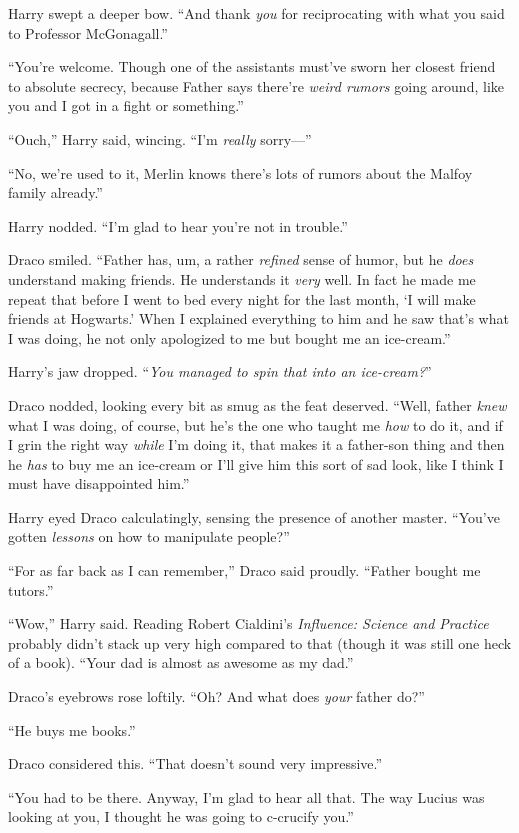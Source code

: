 Harry swept a deeper bow. “And thank \emph{you} for reciprocating with what you said to Professor McGonagall.”

“You’re welcome. Though one of the assistants must’ve sworn her closest friend to absolute secrecy, because Father says there’re \emph{weird rumors} going around, like you and I got in a fight or something.”

“Ouch,” Harry said, wincing. “I’m \emph{really} sorry—”

“No, we’re used to it, Merlin knows there’s lots of rumors about the Malfoy family already.”

Harry nodded. “I’m glad to hear you’re not in trouble.”

Draco smiled. “Father has, um, a rather \emph{refined} sense of humor, but he \emph{does} understand making friends. He understands it \emph{very} well. In fact he made me repeat that before I went to bed every night for the last month, ‘I will make friends at Hogwarts.’ When I explained everything to him and he saw that’s what I was doing, he not only apologized to me but bought me an ice-cream.”

Harry’s jaw dropped. “\emph{You managed to spin that into an ice-cream?}”

Draco nodded, looking every bit as smug as the feat deserved. “Well, father \emph{knew} what I was doing, of course, but he’s the one who taught me \emph{how} to do it, and if I grin the right way \emph{while} I’m doing it, that makes it a father-son thing and then he \emph{has} to buy me an ice-cream or I’ll give him this sort of sad look, like I think I must have disappointed him.”

Harry eyed Draco calculatingly, sensing the presence of another master. “You’ve gotten \emph{lessons} on how to manipulate people?”

“For as far back as I can remember,” Draco said proudly. “Father bought me tutors.”

“Wow,” Harry said. Reading Robert Cialdini’s \emph{Influence: Science and Practice} probably didn’t stack up very high compared to that (though it was still one heck of a book). “Your dad is almost as awesome as my dad.”

Draco’s eyebrows rose loftily. “Oh? And what does \emph{your} father do?”

“He buys me books.”

Draco considered this. “That doesn’t sound very impressive.”

“You had to be there. Anyway, I’m glad to hear all that. The way Lucius was looking at you, I thought he was going to c-crucify you.”

